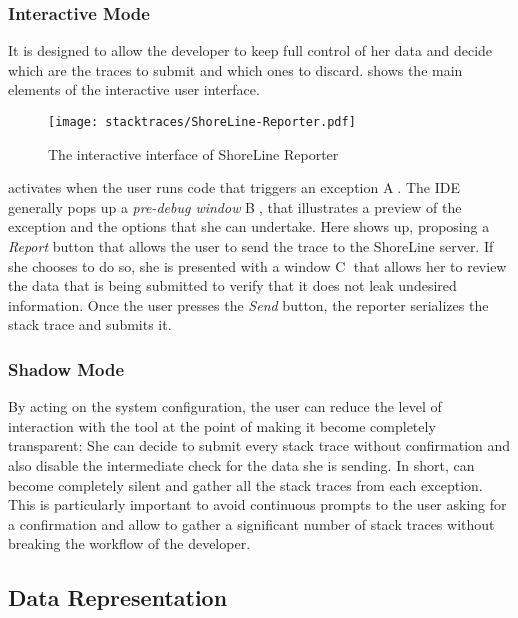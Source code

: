\subsubsection{Interactive Mode}
It is designed to allow the developer to keep full control of her data and decide which are the traces to submit and which ones to discard.
 shows the main elements of the interactive user interface.

\begin{figure}[ht]
\begin{center}
  \texttt{[image: stacktraces/ShoreLine-Reporter.pdf]}
  \caption{The interactive interface of ShoreLine Reporter}
  \label{fig:shoreline-reporter}
\end{center}
\end{figure}

\slr activates when the user runs code that triggers an exception \textcircled{\scriptsize A}.
The \pha IDE generally pops up a \emph{pre-debug window} \textcircled{\scriptsize B}, that illustrates a preview of the exception and the options that she can undertake.
Here \slr shows up, proposing a \emph{Report} button that allows the user to send the trace to the ShoreLine server.
If she chooses to do so, she is presented with a window \textcircled{\scriptsize C} that allows her to review the data that is being submitted to verify that it does not leak undesired information.
Once the user presses the \emph{Send} button, the reporter serializes the stack trace and submits it.

\subsubsection{Shadow Mode}
By acting on the system configuration, the user can reduce the level of interaction with the tool at the point of making it become completely transparent: She can decide to submit every stack trace without confirmation and also disable the intermediate check for the data she is sending.
In short, \slr can become completely silent and gather all the stack traces from each exception.
This is particularly important to avoid continuous prompts to the user asking for a confirmation and allow \slr to gather a significant number of stack traces without breaking the workflow of the developer.


\subsection{Data Representation}

